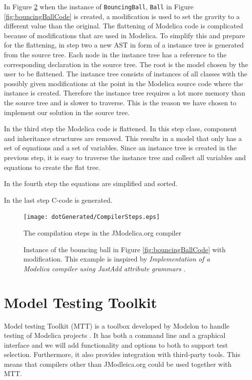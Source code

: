 \documentclass{cslthse-msc}
\begin{document}
In Figure \ref{fig:bouncingBallInstance} when the instance of \texttt{BouncingBall}, \texttt{Ball} in Figure \ref{fig:bouncingBallCode} is created, a modification is used to set the gravity to a different value than the original. The flattening of Modelica code is complicated because of modifications that are used in Modelica. To simplify this and  prepare for the flattening, in step two a new AST in form of a instance tree is generated from the source tree. Each node in the instance tree has a reference to the corresponding declaration in the source tree. The root is the model chosen by the user to be flattened. The instance tree consists of instances of all classes with the possibly given modifications at the point in the Modelica source code where the instance is created. Therefore the instance tree requires a lot more memory than the source tree and is slower to traverse. This is the reason we have chosen to implement our solution in the source tree. 

In the third step the Modelica code is flattened. In this step class, component and inheritance structures are removed. This results in a model that only has a set of equations and a set of variables. Since an instance tree is created in the previous step, it is easy to traverse the instance tree and collect all variables and equations to create the flat tree.

In the fourth step the equations are simplified and sorted.

In the last step C-code is generated. 

\begin{figure}[!htbp]
    \centering
    {\texttt{[image: dotGenerated/CompilerSteps.eps]}}
    \caption{The compilation steps in the JModelica.org compiler}
    \label{fig:compilerSteps}
\end{figure}

\begin{figure}[!htbp]
    \centering
    
    \caption{Instance of the bouncing ball in Figure \ref{fig:bouncingBallCode} with modification. This example is inspired by \textit{Implementation of a Modelica compiler using JastAdd attribute grammars} \cite{aakesson2010implementation}.}
    \label{fig:bouncingBallInstance}
\end{figure}

\section{Model Testing Toolkit}
Model testing Toolkit (MTT) is a toolbox developed by Modelon to handle testing of Modelica projects \cite{modelon.comMTT}. It has both a command line and a graphical interface and we will add functionality and options to both to support test selection. Furthermore, it also provides integration with third-party tools. This means that compilers other than JModleica.org could be used together with MTT.
\end{document}
